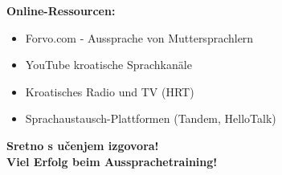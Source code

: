 \textbf{Online-Ressourcen:}
\begin{itemize}
    \item Forvo.com - Aussprache von Muttersprachlern
    \item YouTube kroatische Sprachkanäle
    \item Kroatisches Radio und TV (HRT)
    \item Sprachaustausch-Plattformen (Tandem, HelloTalk)
\end{itemize}

\vspace{1cm}

\begin{center}
\textbf{\Large Sretno s učenjem izgovora!}\\
\textbf{\Large Viel Erfolg beim Aussprachetraining!}
\end{center}
